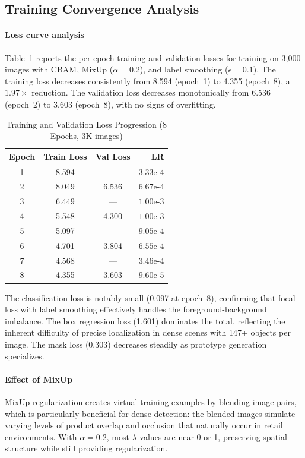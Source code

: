 \documentclass[conference]{IEEEtran}
\begin{document}
\subsection{Training Convergence Analysis}
\label{sec:convergence}

\paragraph{Loss curve analysis}
Table~\ref{tab:loss_curve} reports the per-epoch training and validation
losses for training on 3{,}000 images with CBAM, MixUp ($\alpha=0.2$),
and label smoothing ($\epsilon=0.1$). The training loss decreases
consistently from 8.594 (epoch~1) to 4.355 (epoch~8), a $1.97\times$
reduction. The validation loss decreases monotonically from 6.536
(epoch~2) to 3.603 (epoch~8), with no signs of overfitting.

\begin{table}[t]
  \centering
  \caption{Training and Validation Loss Progression (8 Epochs, 3K images)}
  \label{tab:loss_curve}
  \begin{tabular}{@{}cccr@{}}
    \toprule
    Epoch & Train Loss & Val Loss & LR \\
    \midrule
    1  & 8.594  & ---   & $3.33\text{e-}4$ \\
    2  & 8.049  & 6.536 & $6.67\text{e-}4$ \\
    3  & 6.449  & ---   & $1.00\text{e-}3$ \\
    4  & 5.548  & 4.300 & $1.00\text{e-}3$ \\
    5  & 5.097  & ---   & $9.05\text{e-}4$ \\
    6  & 4.701  & 3.804 & $6.55\text{e-}4$ \\
    7  & 4.568  & ---   & $3.46\text{e-}4$ \\
    8  & 4.355  & 3.603 & $9.60\text{e-}5$ \\
    \bottomrule
  \end{tabular}
\end{table}

The classification loss is notably small (0.097 at epoch~8), confirming
that focal loss with label smoothing effectively handles the
foreground-background imbalance. The box regression loss (1.601)
dominates the total, reflecting the inherent difficulty of precise
localization in dense scenes with 147+ objects per image. The mask loss
(0.303) decreases steadily as prototype generation specializes.

\paragraph{Effect of MixUp}
MixUp regularization creates virtual training examples by blending
image pairs, which is particularly beneficial for dense detection:
the blended images simulate varying levels of product overlap and
occlusion that naturally occur in retail environments. With
$\alpha = 0.2$, most $\lambda$ values are near 0 or 1, preserving
spatial structure while still providing regularization.
\end{document}

